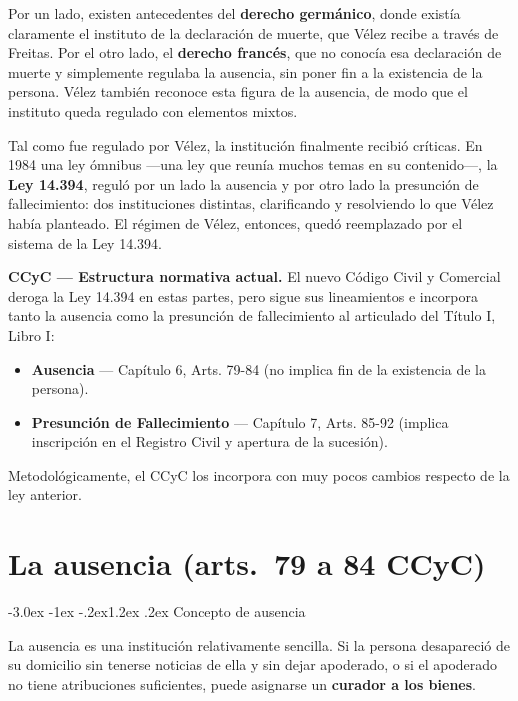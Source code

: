 \documentclass[12pt,oneside]{book}
\makeatletter
\renewcommand\section{\@startsection{section}{1}{\z@}%
  {-3.0ex \@plus -1ex \@minus -.2ex}{1.2ex \@plus .2ex}%
  {\normalfont\large\bfseries\color{acento}}}
\makeatother
\begin{document}
Por un lado, existen antecedentes del \textbf{derecho germánico}, donde
existía claramente el instituto de la declaración de muerte, que Vélez
recibe a través de Freitas. Por el otro lado, el \textbf{derecho
francés}, que no conocía esa declaración de muerte y simplemente regulaba
la ausencia, sin poner fin a la existencia de la persona. Vélez también
reconoce esta figura de la ausencia, de modo que el instituto queda
regulado con elementos mixtos.

Tal como fue regulado por Vélez, la institución finalmente recibió
críticas. En 1984 una ley ómnibus ---una ley que reunía muchos temas en su
contenido---, la \textbf{Ley 14.394}, reguló por un lado la ausencia y por
otro lado la presunción de fallecimiento: dos instituciones distintas,
clarificando y resolviendo lo que Vélez había planteado. El régimen de
Vélez, entonces, quedó reemplazado por el sistema de la Ley 14.394.

\begin{importante}
\textbf{CCyC --- Estructura normativa actual.} El nuevo Código Civil y
Comercial deroga la Ley 14.394 en estas partes, pero sigue sus
lineamientos e incorpora tanto la ausencia como la presunción de
fallecimiento al articulado del Título I, Libro I:
\begin{itemize}
    \item \textbf{Ausencia} --- Capítulo 6, Arts. 79-84 (no implica fin de la existencia de la persona).
    \item \textbf{Presunción de Fallecimiento} --- Capítulo 7, Arts. 85-92 (implica inscripción en el Registro Civil y apertura de la sucesión).
\end{itemize}
Metodológicamente, el CCyC los incorpora con muy pocos cambios respecto de
la ley anterior.
\end{importante}


\chapter{La ausencia (arts.~79 a 84 CCyC)}
\section{Concepto de ausencia}

La ausencia es una institución relativamente sencilla. Si la persona
desapareció de su domicilio sin tenerse noticias de ella y sin dejar
apoderado, o si el apoderado no tiene atribuciones suficientes, puede
asignarse un \textbf{curador a los bienes}.
\end{document}
